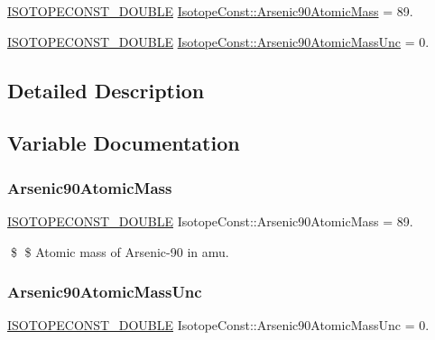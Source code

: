 \begin{DoxyCompactItemize}
\item 
\mbox{\hyperlink{group___isotope_const-_macros_ga8f45a7272ce02c0b4c65c44636ed719a}{I\+S\+O\+T\+O\+P\+E\+C\+O\+N\+S\+T\+\_\+\+D\+O\+U\+B\+LE}} \mbox{\hyperlink{group___isotope_const-_arsenic-_as90_gaedf330010c9b14d4ce19cd402701469a}{Isotope\+Const\+::\+Arsenic90\+Atomic\+Mass}} = 89.
\item 
\mbox{\hyperlink{group___isotope_const-_macros_ga8f45a7272ce02c0b4c65c44636ed719a}{I\+S\+O\+T\+O\+P\+E\+C\+O\+N\+S\+T\+\_\+\+D\+O\+U\+B\+LE}} \mbox{\hyperlink{group___isotope_const-_arsenic-_as90_ga0f6aa5c38c53876ba8e31524ccb39d0f}{Isotope\+Const\+::\+Arsenic90\+Atomic\+Mass\+Unc}} = 0.
\end{DoxyCompactItemize}


\subsection{Detailed Description}


\subsection{Variable Documentation}
\mbox{\label{group___isotope_const-_arsenic-_as90_gaedf330010c9b14d4ce19cd402701469a}} 
\subsubsection{\texorpdfstring{Arsenic90\+Atomic\+Mass}{Arsenic90AtomicMass}}
{\footnotesize\ttfamily \mbox{\hyperlink{group___isotope_const-_macros_ga8f45a7272ce02c0b4c65c44636ed719a}{I\+S\+O\+T\+O\+P\+E\+C\+O\+N\+S\+T\+\_\+\+D\+O\+U\+B\+LE}} Isotope\+Const\+::\+Arsenic90\+Atomic\+Mass = 89.}

\$ \$ Atomic mass of Arsenic-\/90 in amu. \mbox{\label{group___isotope_const-_arsenic-_as90_ga0f6aa5c38c53876ba8e31524ccb39d0f}} 
\subsubsection{\texorpdfstring{Arsenic90\+Atomic\+Mass\+Unc}{Arsenic90AtomicMassUnc}}
{\footnotesize\ttfamily \mbox{\hyperlink{group___isotope_const-_macros_ga8f45a7272ce02c0b4c65c44636ed719a}{I\+S\+O\+T\+O\+P\+E\+C\+O\+N\+S\+T\+\_\+\+D\+O\+U\+B\+LE}} Isotope\+Const\+::\+Arsenic90\+Atomic\+Mass\+Unc = 0.}

